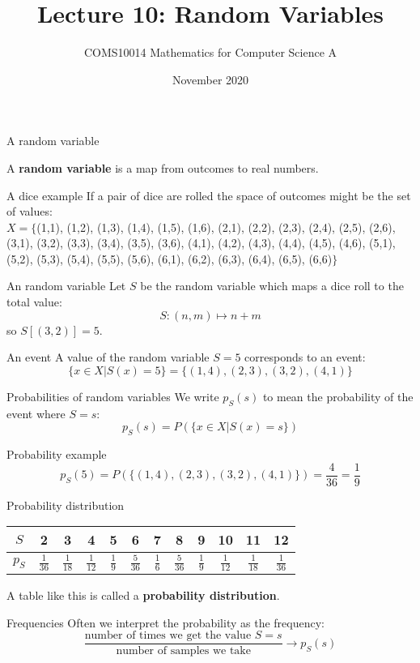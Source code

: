 \documentclass{beamer}
\title{Lecture 10: Random Variables}
\author{COMS10014 Mathematics for Computer Science A}
\institute{\texttt{cs-uob.github.io/COMS10014/ and github.com/coms10011/2020\_21}}
\date{November 2020}
\newcommand{\crish}{\color{reddish}}
\newcommand{\cbla}{\color{black}}
\begin{document}
\maketitle

\begin{frame}{A random variable}

  A \textbf{random variable} is a map from outcomes to real numbers.

\end{frame}

\begin{frame}{A dice example}
If a pair of dice are rolled the space of outcomes might be the set of values:\\ \crish{}$X=\{$(1,1), (1,2), (1,3), (1,4), (1,5), (1,6), (2,1), (2,2), (2,3), (2,4), (2,5), (2,6), (3,1), (3,2), (3,3), (3,4), (3,5), (3,6), (4,1), (4,2), (4,3), (4,4), (4,5), (4,6), (5,1), (5,2), (5,3), (5,4), (5,5), (5,6), (6,1), (6,2), (6,3), (6,4), (6,5), (6,6)$\}$\cbla{} 
\end{frame}

\begin{frame}{An random variable}
  Let \crish$S$\cbla{}  be the random variable which maps a dice roll to the total value:
  \crish$$S:(n,m)\mapsto n+m$$\cbla{}
  so \crish$S[(3,2)]=5$\cbla{}.
\end{frame}

\begin{frame}{An event}
  A value of the random variable \crish$S=5$\cbla{} corresponds to an event:
  \crish$$
  \{x\in X|S(x)=5\}=\{(1,4), (2,3), (3,2), (4,1)\}
  $$\cbla{}
\end{frame}

\begin{frame}{Probabilities of random variables}
  We write \crish$p_S(s)$\cbla{}  to mean the probability of the event where \crish$S=s$\cbla{}:
  \crish$$
  p_S(s)=P(\{x\in X|S(x)=s\})
  $$\cbla{}
\end{frame}


\begin{frame}{Probability example}
  \crish$$
  p_S(5)=P(\{(1,4), (2,3), (3,2), (4,1)\})=\frac{4}{36}=\frac{1}{9}
  $$\cbla{}
\end{frame}

\begin{frame}{Probability distribution}
\color{purple}
  \begin{center}
\begin{tabular}{c|ccccccccccc}
$S$&2&3&4&5&6&7&8&9&10&11&12\\
  \hline
\rule{0pt}{3ex}$p_S$&$\frac{1}{36}$&$\frac{1}{18}$&$\frac{1}{12}$&$\frac{1}{9}$&$\frac{5}{36}$&$\frac{1}{6}$&$\frac{5}{36}$&$\frac{1}{9}$&$\frac{1}{12}$&$\frac{1}{18}$&$\frac{1}{36}$
\end{tabular}
  \end{center}
\cbla{} A table like this is called a \textbf{probability distribution}.
  \end{frame}

\begin{frame}{Frequencies}
  Often we interpret the probability as the frequency:
  \crish$$
  \frac{\mbox{number of times we get the value }S=s}{\mbox{number of samples we take}}\rightarrow p_S(s)
  $$\cbla{}
\end{frame}
\end{document}
